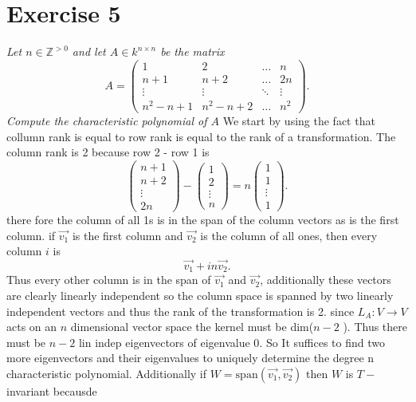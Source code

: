\documentclass{article}
\begin{document}
     \section{Exercise 5}
     \emph{
         Let $n \in \mathbb{Z}^{>0}$ and let $A \in k^{n \times n}$ be the matrix
         \[
         A = \begin{pmatrix} 
             1 & 2 & ... & n\\
             n+1 & n+2 & ... & 2n\\
             \vdots & \vdots & \ddots & \vdots\\
             n^2-n+1 & n^2-n+2 & ... & n^2
         \end{pmatrix} 
         .\] 
         Compute the characteristic polynomial of $A$
     }
     We start by using the fact that collumn rank is equal to row rank is equal to the rank of a transformation.
     The column rank is 2 because row 2 - row 1 is
     \[
         \begin{pmatrix} n + 1 \\ n + 2 \\ \vdots \\ 2n \end{pmatrix}  - \begin{pmatrix} 1 \\ 2 \\ \vdots \\ n \end{pmatrix} = n \begin{pmatrix} 1 \\ 1 \\ \vdots \\ 1 \end{pmatrix} 
     .\] 
     there fore the column of all 1s is in the span of the column vectors as is the first column.
     if $\vec{v_1} $ is the first column and $\vec{v_2} $ is the column of all ones, then every column $i$ is
     \[
     \vec{v_1} + in\vec{v_2}
     .\] 
     Thus every other column is in the span of $\vec{v_1}$ and $\vec{v_2}$, additionally these vectors are clearly
     linearly independent so the column space is spanned by two linearly independent vectors and thus the rank of the
     transformation is 2. since  $L_A : V \rightarrow V$ acts on an $n $ dimensional vector space the kernel must be dim($n-2$ ).
     Thus there must be $n-2$ lin indep eigenvectors of eigenvalue 0. So It suffices to find two more eigenvectors and their eigenvalues to uniquely determine the degree
     n characteristic polynomial.
     Additionally if $W = \text{span}(\vec{v_1}, \vec{v_2})$ then $W$ is  $T-$invariant becausde
\end{document}
